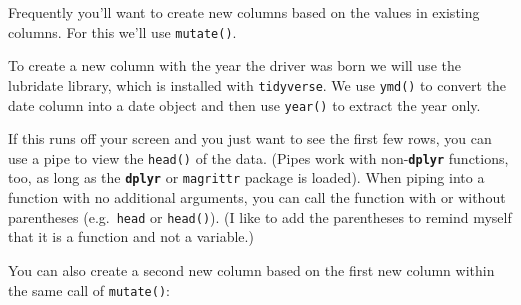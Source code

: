 \documentclass[]{book}
\newenvironment{Shaded}{\begin{snugshade}}{\end{snugshade}}
\newcommand{\DataTypeTok}[1]{\textcolor[rgb]{0.13,0.29,0.53}{#1}}
\newcommand{\DecValTok}[1]{\textcolor[rgb]{0.00,0.00,0.81}{#1}}
\newcommand{\KeywordTok}[1]{\textcolor[rgb]{0.13,0.29,0.53}{\textbf{#1}}}
\newcommand{\NormalTok}[1]{#1}
\newcommand{\OperatorTok}[1]{\textcolor[rgb]{0.81,0.36,0.00}{\textbf{#1}}}
\newcommand{\StringTok}[1]{\textcolor[rgb]{0.31,0.60,0.02}{#1}}
\begin{document}
Frequently you'll want to create new columns based on the values in existing columns. For this we'll use \texttt{mutate()}.

To create a new column with the year the driver was born we will use the lubridate library, which is installed with \texttt{tidyverse}. We use \texttt{ymd()} to convert the date column into a date object and then use \texttt{year()} to extract the year only.

\begin{Shaded}
\end{Shaded}

If this runs off your screen and you just want to see the first few rows, you
can use a pipe to view the \texttt{head()} of the data. (Pipes work with non-\textbf{\texttt{dplyr}}
functions, too, as long as the \textbf{\texttt{dplyr}} or \texttt{magrittr} package is loaded). When piping into a function with no additional arguments, you can call the
function with or without parentheses (e.g.~\texttt{head} or \texttt{head()}). (I like to add the parentheses to remind myself that it is a function and not a variable.)

\begin{Shaded}
\end{Shaded}

You can also create a second new column based on the first new column within the same call of \texttt{mutate()}:

\begin{Shaded}
\end{Shaded}
\end{document}
